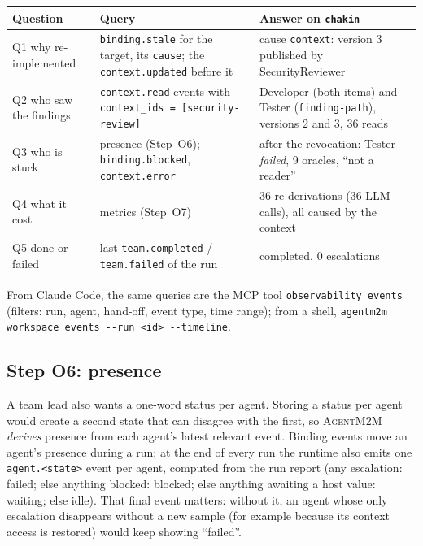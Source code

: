 \documentclass[10pt,a4paper]{article}
\newcommand{\tool}{\textsc{AgentM2M}}
\newcommand{\code}[1]{\texttt{#1}}
\theoremstyle{definition}
\begin{document}
\begin{center}\small
\begin{tabularx}{\textwidth}{@{}l X X@{}}
\toprule
Question & Query & Answer on \texttt{chakin} \\
\midrule
Q1 why re-implemented & \code{binding.stale} for the target, its \code{cause}; the \code{context.updated} before it & cause \code{context}: version 3 published by SecurityReviewer \\
Q2 who saw the findings & \code{context.read} events with \code{context\_ids = [security-review]} & Developer (both items) and Tester (\code{finding-path}), versions 2 and 3, 36 reads \\
Q3 who is stuck & presence (Step~O6); \code{binding.blocked}, \code{context.error} & after the revocation: Tester \emph{failed}, 9 oracles, ``not a reader'' \\
Q4 what it cost & metrics (Step~O7) & 36 re-derivations (36 LLM calls), all caused by the context \\
Q5 done or failed & last \code{team.completed} / \code{team.failed} of the run & completed, 0 escalations \\
\bottomrule
\end{tabularx}
\end{center}

\noindent From Claude Code, the same queries are the MCP tool
\code{observability\_events} (filters: run, agent, hand-off, event type, time
range); from a shell, \code{agentm2m workspace events -{}-run <id> -{}-timeline}.

\subsection{Step O6: presence}\label{sec:presence}

A team lead also wants a one-word status per agent. Storing a status per
agent would create a second state that can disagree with the first, so
\tool{} \emph{derives} presence from each agent's latest relevant event.
Binding events move an agent's presence during a run; at the end of every
run the runtime also emits one \code{agent.<state>} event per agent, computed
from the run report (any escalation: failed; else anything blocked: blocked;
else anything awaiting a host value: waiting; else idle). That final event
matters: without it, an agent whose only escalation disappears without a new
sample (for example because its context access is restored) would keep
showing ``failed''.
\end{document}

